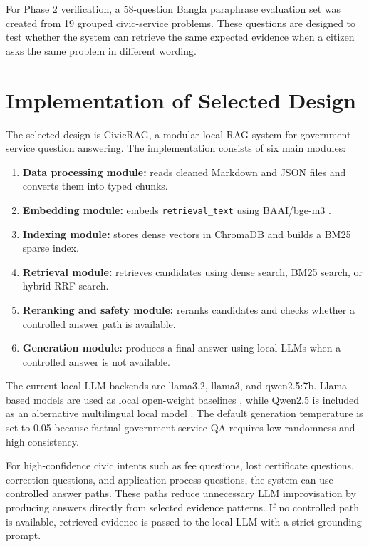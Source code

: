 For Phase 2 verification, a 58-question Bangla paraphrase evaluation set was created from 19 grouped civic-service problems. These questions are designed to test whether the system can retrieve the same expected evidence when a citizen asks the same problem in different wording.

\section{Implementation of Selected Design}

The selected design is CivicRAG, a modular local RAG system for government-service question answering. The implementation consists of six main modules:

\begin{enumerate}
    \item \textbf{Data processing module:} reads cleaned Markdown and JSON files and converts them into typed chunks.
    \item \textbf{Embedding module:} embeds \texttt{retrieval\_text} using BAAI/bge-m3 \cite{chen2024bgem3}.
    \item \textbf{Indexing module:} stores dense vectors in ChromaDB and builds a BM25 sparse index.
    \item \textbf{Retrieval module:} retrieves candidates using dense search, BM25 search, or hybrid RRF search.
    \item \textbf{Reranking and safety module:} reranks candidates and checks whether a controlled answer path is available.
    \item \textbf{Generation module:} produces a final answer using local LLMs when a controlled answer is not available.
\end{enumerate}

The current local LLM backends are llama3.2, llama3, and qwen2.5:7b. Llama-based models are used as local open-weight baselines \cite{dubey2024llama3}, while Qwen2.5 is included as an alternative multilingual local model \cite{qwen2025qwen25}. The default generation temperature is set to 0.05 because factual government-service QA requires low randomness and high consistency.

For high-confidence civic intents such as fee questions, lost certificate questions, correction questions, and application-process questions, the system can use controlled answer paths. These paths reduce unnecessary LLM improvisation by producing answers directly from selected evidence patterns. If no controlled path is available, retrieved evidence is passed to the local LLM with a strict grounding prompt.

